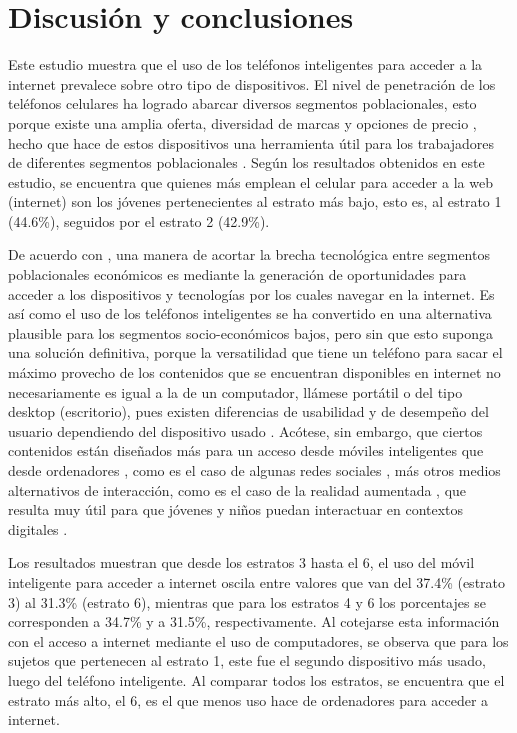 \documentclass[spanish]{textolivre}
\begin{document}
\section{Discusión y conclusiones}
Este estudio muestra que el uso de los teléfonos inteligentes para acceder a la internet prevalece sobre otro tipo de dispositivos. El nivel de penetración de los teléfonos celulares ha logrado abarcar diversos segmentos poblacionales, esto porque existe una amplia oferta, diversidad de marcas y opciones de precio \cite{mongardini2020}, hecho que hace de estos dispositivos una herramienta útil para los trabajadores de diferentes segmentos poblacionales \cite{agger2011}. Según los resultados obtenidos en este estudio, se encuentra que quienes más emplean el celular para acceder a la web (internet) son los jóvenes pertenecientes al estrato más bajo, esto es, al estrato 1 (44.6\%), seguidos por el estrato 2 (42.9\%).

De acuerdo con \textcite{anaya_figueroa2021}, una manera de acortar la brecha tecnológica entre segmentos poblacionales económicos es mediante la generación de oportunidades para acceder a los dispositivos y tecnologías por los cuales navegar en la internet. Es así como el uso de los teléfonos inteligentes se ha convertido en una alternativa plausible para los segmentos socio-económicos bajos, pero sin que esto suponga una solución definitiva, porque la versatilidad que tiene un teléfono para sacar el máximo provecho de los contenidos que se encuentran disponibles en internet no necesariamente es igual a la de un computador, llámese portátil o del tipo desktop (escritorio), pues existen diferencias de usabilidad y de desempeño del usuario dependiendo del dispositivo usado \cite{ha2020}. Acótese, sin embargo, que ciertos contenidos están diseñados más para un acceso desde móviles inteligentes que desde ordenadores \cite{kelton2020}, como es el caso de algunas redes sociales \cite{arkansyah2021}, más otros medios alternativos de interacción, como es el caso de la realidad aumentada \cite{li2020}, que resulta muy útil para que jóvenes y niños puedan interactuar en contextos digitales \cite{yadav2020}.

Los resultados muestran que desde los estratos 3 hasta el 6, el uso del móvil inteligente para acceder a internet oscila entre valores que van del 37.4\% (estrato 3) al 31.3\% (estrato 6), mientras que para los estratos 4 y 6 los porcentajes se corresponden a 34.7\% y a 31.5\%, respectivamente. Al cotejarse esta información con el acceso a internet mediante el uso de computadores, se observa que para los sujetos que pertenecen al estrato 1, este fue el segundo dispositivo más usado, luego del teléfono inteligente. Al comparar todos los estratos, se encuentra que el estrato más alto, el 6, es el que menos uso hace de ordenadores para acceder a internet.
\end{document}
